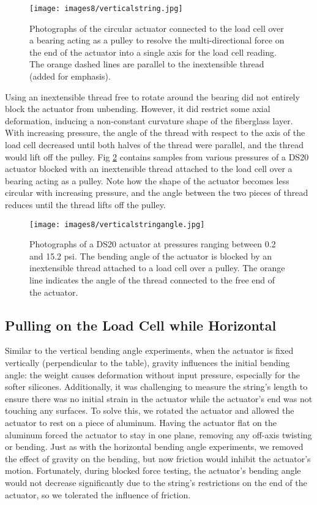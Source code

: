\begin{figure}[ht]
    \centering
     \texttt{[image: images8/verticalstring.jpg]}
    \caption{Photographs of the circular actuator connected to the load cell over a bearing acting as a pulley to resolve the multi-directional force on the end of the actuator into a single axis for the load cell reading. The orange dashed lines are parallel to the inextensible thread (added for emphasis).}
    \label{fig:verticalstring}
\end{figure}

Using an inextensible thread free to rotate around the bearing did not entirely block the actuator from unbending. However, it did restrict some axial deformation, inducing a non-constant curvature shape of the fiberglass layer. With increasing pressure, the angle of the thread with respect to the axis of the load cell decreased until both halves of the thread were parallel, and the thread would lift off the pulley. Fig \ref{fig:verticalstringangle} contains samples from various pressures of a DS20 actuator blocked with an inextensible thread attached to the load cell over a bearing acting as a pulley. Note how the shape of the actuator becomes less circular with increasing pressure, and the angle between the two pieces of thread reduces until the thread lifts off the pulley. 

\begin{figure}[ht]
    \centering
     \texttt{[image: images8/verticalstringangle.jpg]}
    \caption{Photographs of a DS20 actuator at pressures ranging between 0.2 and 15.2 psi. The bending angle of the actuator is blocked by an inextensible thread attached to a load cell over a pulley. The orange line indicates the angle of the thread connected to the free end of the actuator.}
    \label{fig:verticalstringangle}
\end{figure}

\clearpage
\subsection{Pulling on the Load Cell while Horizontal}

Similar to the vertical bending angle experiments, when the actuator is fixed vertically (perpendicular to the table), gravity influences the initial bending angle: the weight causes deformation without input pressure, especially for the softer silicones. Additionally, it was challenging to measure the string's length to ensure there was no initial strain in the actuator while the actuator's end was not touching any surfaces. To solve this, we rotated the actuator and allowed the actuator to rest on a piece of aluminum. Having the actuator flat on the aluminum forced the actuator to stay in one plane, removing any off-axis twisting or bending. Just as with the horizontal bending angle experiments, we removed the effect of gravity on the bending, but now friction would inhibit the actuator's motion. Fortunately, during blocked force testing, the actuator's bending angle would not decrease significantly due to the string's restrictions on the end of the actuator, so we tolerated the influence of friction. 

